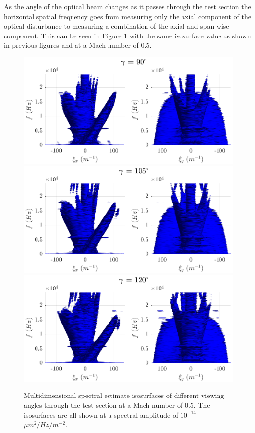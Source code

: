 As the angle of the optical beam changes as it passes through the test section the horizontal spatial frequency goes from measuring only the axial component of the optical disturbance to measuring a combination of the axial and span-wise component.
This can be seen in Figure \ref{fig:04_dispersion_angle} with the same isosurface value as shown in previous figures and at a Mach number of 0.5.
\begin{figure}
  \centering
  \includegraphics{../matlab/04_dispersion_analysis/dispersion_angle_90.eps}
  \includegraphics{../matlab/04_dispersion_analysis/dispersion_angle_105.eps}
  \includegraphics{../matlab/04_dispersion_analysis/dispersion_angle_120.eps}
  \caption{Multidimensional spectral estimate isosurfaces of different viewing angles through the test section at a Mach number of 0.5. The isosurfaces are all shown at a spectral amplitude of $10^{-14}$ $\mu m^2/Hz/m^{-2}$.}
  \label{fig:04_dispersion_angle}
\end{figure}
